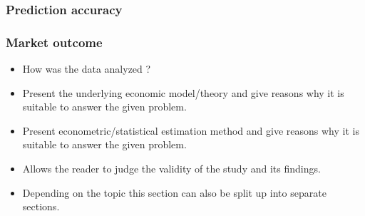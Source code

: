 \subsubsection{Prediction accuracy}

\subsubsection{Market outcome}
 




\begin{itemize}

    \item How was the data analyzed ?

    \item Present the underlying economic model/theory and
        give reasons why it is suitable to answer the given problem.

    \item Present econometric/statistical estimation method and
        give reasons why it is suitable to answer the given problem.

    \item Allows the reader to judge the validity of the study and its findings.

    \item Depending on the topic this section can also be split up into separate sections.

\end{itemize}
